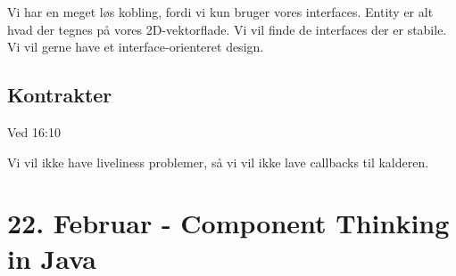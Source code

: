 \documentclass{article}
\begin{document}
Vi har en meget løs kobling, fordi vi kun bruger vores interfaces. Entity er alt
hvad der tegnes på vores 2D-vektorflade. 
Vi vil finde de interfaces der er stabile. Vi vil gerne have et
interface-orienteret design.

\subsection{Kontrakter}
Ved 16:10

Vi vil ikke have liveliness problemer, så vi vil ikke lave callbacks til
kalderen.

\section{22. Februar - Component Thinking in Java}%
\label{sec:22_februar_component_thinking_in_java}
\end{document}
